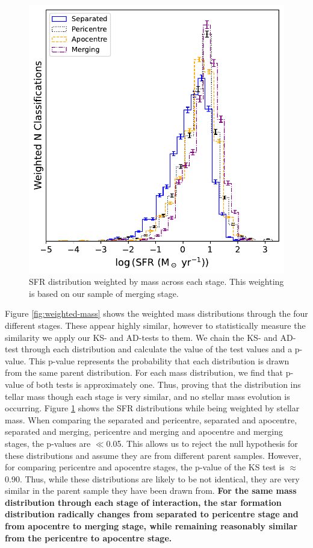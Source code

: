 \begin{figure}
    \centering
    \includegraphics[width=\textwidth]{Chapter3/figures/sfr_dist.pdf}
    \caption[SFR distribution weighted by mass across each stage.]{SFR distribution weighted by mass across each stage. This weighting is based on our sample of merging stage.}
    \label{fig:weighted-sfr}
\end{figure}

Figure \ref{fig:weighted-mass} shows the weighted mass distributions through the four different stages. These appear highly similar, however to statistically measure the similarity we apply our KS- and AD-tests to them. We chain the KS- and AD- test through each distribution and calculate the value of the test values and a p-value. This p-value represents the probability that each distribution is drawn from the same parent distribution. For each mass distribution, we find that p-value of both tests is approximately one. Thus, proving that the distribution ins tellar mass though each stage is very similar, and no stellar mass evolution is occurring. Figure \ref{fig:weighted-sfr} shows the SFR distributions while being weighted by stellar mass. When comparing the separated and pericentre, separated and apocentre, separated and merging, pericentre and merging and apocentre and merging stages, the p-values are $\ll$0.05. This allows us to reject the null hypothesis for these distributions and assume they are from different parent samples. However, for comparing pericentre and apocentre stages, the p-value of the KS test is $\approx$0.90. Thus, while these distributions are likely to be not identical, they are very similar in the parent sample they have been drawn from. \textbf{For the same mass distribution through each stage of interaction, the star formation distribution radically changes from separated to pericentre stage and from apocentre to merging stage, while remaining reasonably similar from the pericentre to apocentre stage.}

